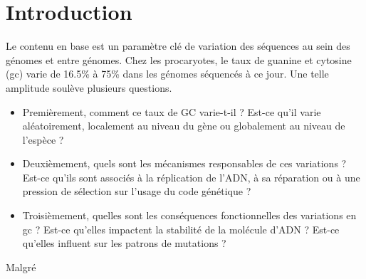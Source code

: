 \section*{Introduction}
\label{sec:introduction}

Le contenu en base est un paramètre clé de variation des séquences au sein des
génomes et entre génomes. Chez les procaryotes, le taux de guanine et cytosine
(\ac{gc}) varie de 16.5\% à 75\% dans les génomes séquencés à ce jour. Une telle
amplitude soulève plusieurs questions.

\begin{itemize}
\item Premièrement, comment ce taux de GC varie-t-il ? Est-ce qu'il varie
  aléatoirement, localement au niveau du gène ou globalement au niveau de
  l'espèce ?
\item Deuxièmement, quels sont les mécanismes responsables de ces variations ?
  Est-ce qu'ils sont associés à la réplication de l'ADN, à sa réparation ou à
  une pression de sélection sur l'usage du code génétique ?
\item Troisièmement, quelles sont les conséquences fonctionnelles des variations
  en \ac{gc} ? Est-ce qu'elles impactent la stabilité de la molécule d'ADN ?
  Est-ce qu'elles influent sur les patrons de mutations ?
\end{itemize}

Malgré

